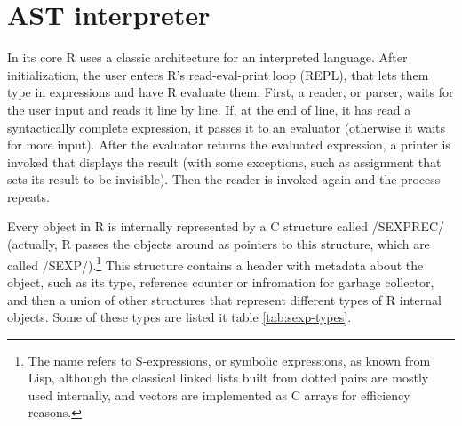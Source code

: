 {\begin{listing}[htbp]
\end{listing}


\section{AST interpreter}

In its core R uses a classic architecture for an interpreted language. After initialization, the user enters R's read-eval-print loop (REPL), that lets them type in expressions and have R evaluate them. First, a reader, or parser, waits for the user input and reads it line by line. If, at the end of line, it has read a syntactically complete expression, it passes it to an evaluator (otherwise it waits for more input). After the evaluator returns the evaluated expression, a printer is invoked that displays the result (with some exceptions, such as assignment that sets its result to be invisible). Then the reader is invoked again and the process repeats.


Every object in R is internally represented by a C structure called \cinline/SEXPREC/ (actually, R passes the objects around as pointers to this structure, which are called \cinline/SEXP/).\footnote{The name refers to S-expressions, or symbolic expressions, as known from Lisp, although the classical linked lists built from dotted pairs are mostly used internally, and vectors are implemented as C arrays for efficiency reasons.} This structure contains a header with metadata about the object, such as its type, reference counter or infromation for garbage collector, and then a union of other structures that represent different types of R internal objects. Some of these types are listed it table \ref{tab:sexp-types}.

}
